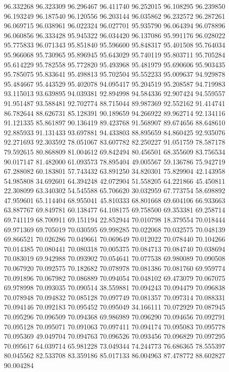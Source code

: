 96.332268
96.323309
96.296467
96.411740
96.252015
96.108295
96.239850
96.193249
96.187540
96.120556
96.203144
96.035862
96.232572
96.287261
96.069715
96.038961
96.022324
96.027701
95.935790
96.064394
96.078896
96.060856
96.333428
95.945322
96.034420
96.137086
95.991176
96.028022
95.775833
96.071343
95.851840
95.596600
95.848317
95.401508
95.764034
95.966068
95.730965
95.896945
95.643029
95.740119
95.803711
95.705284
95.614229
95.782558
95.772820
95.493968
95.481979
95.690606
95.903435
95.785075
95.833641
95.498813
95.702504
95.552233
95.009637
94.929878
95.484667
95.443529
95.402078
94.095417
95.204519
95.208587
94.719983
93.115013
93.639895
94.039381
92.894998
94.584336
92.907424
94.559557
91.951487
93.588481
92.702774
88.715044
89.987369
92.552162
91.414741
86.782644
88.626731
85.128391
90.189659
94.266922
89.962714
92.134116
91.121335
85.861897
90.136419
89.423768
91.568907
89.674656
88.648610
92.885933
91.131433
93.697881
94.433803
88.895659
84.860425
92.935076
92.271693
92.303592
78.051067
83.607782
82.250227
91.051759
78.587178
79.592615
80.868809
81.004612
69.842494
80.456501
68.355609
83.756534
90.017147
81.482000
61.093573
78.895404
49.005567
59.136786
75.942719
67.288082
60.183801
57.743432
63.891250
34.820301
75.829904
42.143958
54.985808
34.692601
64.394248
42.072904
51.558205
64.221866
45.450811
22.308099
63.340302
54.545588
65.706620
30.032959
67.773754
58.698892
47.959601
65.114404
68.955041
45.810333
68.801668
69.604106
66.933663
63.887767
69.849781
60.138477
64.108175
69.758500
69.353381
69.258714
69.741119
68.700911
69.151194
22.852944
70.010798
18.379554
70.018444
69.971369
69.705019
70.030595
69.998285
70.022068
70.032575
70.048139
69.866521
70.026286
70.049661
70.069649
70.012022
70.078440
70.104266
70.014385
70.080441
70.080318
70.005375
70.084713
70.084740
70.038694
70.083019
69.942988
70.093902
70.054641
70.077538
69.980089
70.090508
70.067920
70.092575
70.182682
70.078978
70.081386
70.081760
69.959774
70.091896
70.067982
70.086889
70.094054
70.048102
69.473079
70.067075
69.978998
70.093035
70.090514
38.559881
70.094243
70.094479
70.096838
70.078948
70.094832
70.085128
70.097749
70.081357
70.097314
70.088331
70.094146
70.092183
70.095452
70.095049
34.166111
70.072929
70.087945
70.095296
70.096509
70.094368
69.986989
70.096290
70.094656
70.092791
70.095128
70.095071
70.091063
70.097411
70.094174
70.095083
70.095778
70.095369
49.049704
70.094763
70.096526
70.093456
70.096829
70.097295
70.095617
64.039714
65.981228
73.049344
74.244773
76.686365
78.555397
80.045562
82.533708
83.359186
85.017133
86.004963
87.478772
88.602827
90.004284
